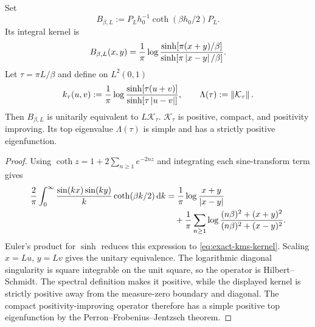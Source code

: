 \begin{lemma}
\label{lem:exact-kms-kernel}
Set
\begin{equation}
 B_{\beta,L}:=P_Lh_0^{-1}\coth(\beta h_0/2)P_L.
\end{equation}
Its integral kernel is
\begin{equation}
 B_{\beta,L}(x,y)
 =\frac1\pi\log\frac{\sinh[\pi(x+y)/\beta]}
 {\sinh[\pi\left\lvert x-y\right\rvert/\beta]}.
 \label{eq:exact-kms-kernel}
\end{equation}
Let $\tau=\pi L/\beta$ and define on $L^2(0,1)$
\begin{equation}
 k_\tau(u,v)
 :=\frac1\pi\log\frac{\sinh[\tau(u+v)]}
 {\sinh[\tau\left\lvert u-v\right\rvert]},
 \qquad
 \Lambda(\tau):=\left\lVert\mathcal K_\tau\right\rVert.
 \label{eq:dimensionless-kernel}
\end{equation}
Then $B_{\beta,L}$ is unitarily equivalent to $L\mathcal K_\tau$.
$\mathcal K_\tau$ is positive, compact, and positivity improving.  Its top
eigenvalue $\Lambda(\tau)$ is simple and has a strictly positive eigenfunction.
\end{lemma}

\begin{proof}
Using $\coth z=1+2\sum_{n\geq1}e^{-2nz}$ and integrating each sine-transform
term gives
\begin{align}
 \frac2\pi\int_0^\infty
 \frac{\sin(kx)\sin(ky)}k\coth(\beta k/2)\,\mathrm d k
 &=\frac1\pi\log\frac{x+y}{\left\lvert x-y\right\rvert}\notag\\
 &\quad+\frac1\pi\sum_{n\geq1}
 \log\frac{(n\beta)^2+(x+y)^2}{(n\beta)^2+(x-y)^2}.
\end{align}
Euler's product for $\sinh$ reduces this expression to
\cref{eq:exact-kms-kernel}.  Scaling $x=Lu$, $y=Lv$ gives the unitary
equivalence.  The logarithmic diagonal singularity is square integrable on the
unit square, so the operator is Hilbert--Schmidt.  The spectral definition
makes it positive, while the displayed kernel is strictly positive away from
the measure-zero boundary and diagonal.  The compact positivity-improving
operator therefore has a simple positive top eigenfunction by the
Perron--Frobenius--Jentzsch theorem.
\end{proof}

